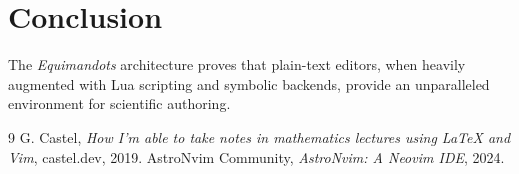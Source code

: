 \documentclass[twocolumn, 10pt]{article}
\begin{document}
\section{Conclusion}

The \textit{Equimandots} architecture proves that plain-text editors, when heavily 
augmented with Lua scripting\cite{astronvim} and symbolic backends, provide 
an unparalleled environment for scientific authoring\cite{castel2019}. 

\begin{thebibliography}{9}
G. Castel, \textit{How I'm able to take notes in mathematics lectures using \LaTeX{} and Vim}, castel.dev, 2019.
AstroNvim Community, \textit{AstroNvim: A Neovim IDE}, 2024.
\end{thebibliography}
\end{document}
